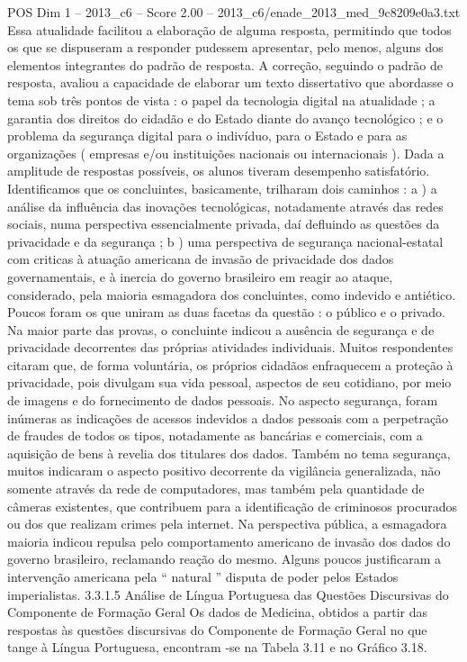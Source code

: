 \begin{textsample}{POS Dim 1 – 2013\_c6 – Score 2.00 – 2013\_c6/enade\_2013\_med\_9c8209e0a3.txt}
Essa atualidade facilitou a elaboração de alguma resposta, permitindo que todos os que se dispuseram a responder pudessem apresentar, pelo menos, alguns dos elementos integrantes do padrão de resposta.
A correção, seguindo o padrão de resposta, avaliou a capacidade de elaborar um texto dissertativo que abordasse o tema sob três pontos de vista : o papel da tecnologia digital na atualidade ; a garantia dos direitos do cidadão e do Estado diante do avanço tecnológico ; e o problema da segurança digital para o indivíduo, para o Estado e para as organizações ( empresas e/ou instituições nacionais ou internacionais ).
Dada a amplitude de respostas possíveis, os alunos tiveram desempenho satisfatório.
Identificamos que os concluintes, basicamente, trilharam dois caminhos : a ) a análise da influência das inovações tecnológicas, notadamente através das redes sociais, numa perspectiva essencialmente privada, daí defluindo as questões da privacidade e da segurança ; b ) uma perspectiva de segurança nacional-estatal com criticas à atuação americana de invasão de privacidade dos dados governamentais, e à inercia do governo brasileiro em reagir ao ataque, considerado, pela maioria esmagadora dos concluintes, como indevido e antiético.
Poucos foram os que uniram as duas facetas da questão : o público e o privado.
Na maior parte das provas, o concluinte indicou a ausência de segurança e de privacidade decorrentes das próprias atividades individuais.
Muitos respondentes citaram que, de forma voluntária, os próprios cidadãos enfraquecem a proteção à privacidade, pois divulgam sua vida pessoal, aspectos de seu cotidiano, por meio de imagens e do fornecimento de dados pessoais.
No aspecto segurança, foram inúmeras as indicações de acessos indevidos a dados pessoais com a perpetração de fraudes de todos os tipos, notadamente as bancárias e comerciais, com a aquisição de bens à revelia dos titulares dos dados.
Também no tema segurança, muitos indicaram o aspecto positivo decorrente da vigilância generalizada, não somente através da rede de computadores, mas também pela quantidade de câmeras existentes, que contribuem para a identificação de criminosos procurados ou dos que realizam crimes pela internet.
Na perspectiva pública, a esmagadora maioria indicou repulsa pelo comportamento americano de invasão dos dados do governo brasileiro, reclamando reação do mesmo.
Alguns poucos justificaram a intervenção americana pela “ natural ” disputa de poder pelos Estados imperialistas. 3.3.1.5 Análise de Língua Portuguesa das Questões Discursivas do Componente de Formação Geral Os dados de Medicina, obtidos a partir das respostas às questões discursivas do Componente de Formação Geral no que tange à Língua Portuguesa, encontram -se na Tabela 3.11 e no Gráfico 3.18.

\end{textsample}
